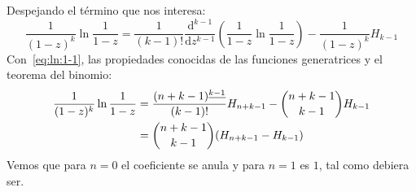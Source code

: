   Despejando el término que nos interesa:
  \begin{equation}
    \label{eq:ln:k-1}
    \frac{1}{(1 - z)^k} \ln \frac{1}{1 - z}
      = \frac{1}{(k - 1)!}
	  \frac{\mathrm{d}^{k - 1}}{\mathrm{d} z^{k - 1}}
	    \left( \frac{1}{1 - z} \ln \frac{1}{1 - z} \right)
	  - \frac{1}{(1 - z)^k} H_{k - 1}
\end{equation}
  Con~\eqref{eq:ln:1-1},
  las propiedades conocidas de las funciones generatrices%
  y el teorema del binomio:%
  \begin{align}
    [z^n] \frac{1}{(1 - z)^k} \ln \frac{1}{1 - z}
      &= \frac{(n + k  - 1)^{\underline{k - 1}}}{(k - 1)!} H_{n + k - 1}
	   - \binom{n + k - 1}{k - 1} H_{k - 1} \notag \\
      &= \binom{n + k - 1}{k - 1} (H_{n + k - 1} - H_{k - 1})
		      \label{eq:ln:k-1:coef}
  \end{align}
  Vemos que para \(n = 0\) el coeficiente se anula
  y para \(n = 1\) es \(1\),
  tal como debiera ser.

